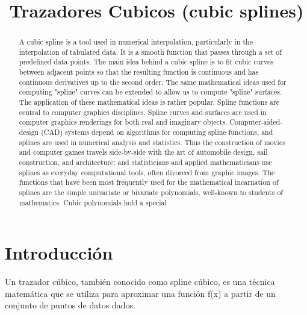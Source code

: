 \documentclass[conference]{IEEEtran}
\begin{document}
\title{Trazadores Cubicos  (cubic splines) \\}

\author{
	}

\maketitle



\begin{abstract}
A cubic spline is a tool used in numerical interpolation, particularly in the interpolation of tabulated data. It is a smooth function that passes through a set of predefined data points. The main idea behind a cubic spline is to fit cubic curves between adjacent points so that the resulting function is continuous and has continuous derivatives up to the second order.
The same mathematical ideas used for computing "spline" curves can be extended to allow us to compute "spline" surfaces.
The application of these mathematical ideas is rather popular. Spline functions are central to computer graphics disciplines. Spline curves and surfaces are used in computer graphics renderings for both real and imaginary objects. Computer-aided-design (CAD) systems depend on algorithms for computing spline functions, and splines are used in numerical analysis and statistics. Thus the construction of movies and computer games travels side-by-side with the art of automobile design, sail construction, and architecture; and statisticians and applied mathematicians use splines as everyday computational tools, often divorced from graphic images.
The functions that have been most frequently used for the mathematical incarnation of splines are the simple univariate or bivariate polynomials, well-known to students of mathematics. Cubic polynomials hold a special

\end{abstract}

\section{Introducción}
Un trazador cúbico, también conocido como spline cúbico, es una técnica matemática que se utiliza para aproximar una función f(x) a partir de un conjunto de puntos de datos dados.
\end{document}
